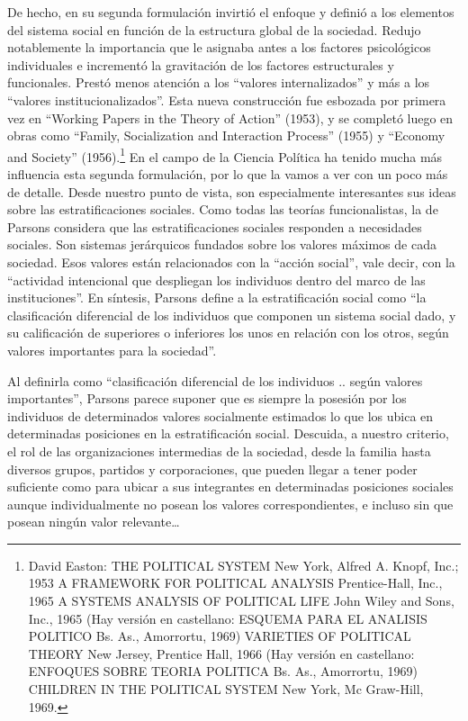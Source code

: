\documentclass[
]{book}
\begin{document}
De hecho, en su segunda formulación invirtió el enfoque y definió a los elementos del sistema social en función de la estructura global de la sociedad. Redujo notablemente la importancia que le asignaba antes a los factores psicológicos individuales e incrementó la gravitación de los factores estructurales y funcionales. Prestó menos atención a los ``valores internalizados'' y más a los ``valores institucionalizados''. Esta nueva construcción fue esbozada por primera vez en ``Working Papers in the Theory of Action'' (1953), y se completó luego en obras como ``Family, Socialization and Interaction Process'' (1955) y ``Economy and Society'' (1956).\footnote{David Easton: THE POLITICAL SYSTEM New York, Alfred A. Knopf, Inc.; 1953 A FRAMEWORK FOR POLITICAL ANALYSIS Prentice-Hall, Inc., 1965 A SYSTEMS ANALYSIS OF POLITICAL LIFE John Wiley and Sons, Inc., 1965 (Hay versión en castellano: ESQUEMA PARA EL ANALISIS POLITICO Bs. As., Amorrortu, 1969) VARIETIES OF POLITICAL THEORY New Jersey, Prentice Hall, 1966 (Hay versión en castellano: ENFOQUES SOBRE TEORIA POLITICA Bs. As., Amorrortu, 1969) CHILDREN IN THE POLITICAL SYSTEM New York, Mc Graw-Hill, 1969.} En el campo de la Ciencia Política ha tenido mucha más influencia esta segunda formulación, por lo que la vamos a ver con un poco más de detalle. Desde nuestro punto de vista, son especialmente interesantes sus ideas sobre las estratificaciones sociales. Como todas las teorías funcionalistas, la de Parsons considera que las estratificaciones sociales responden a necesidades sociales. Son sistemas jerárquicos fundados sobre los valores máximos de cada sociedad. Esos valores están relacionados con la ``acción social'', vale decir, con la ``actividad intencional que despliegan los individuos dentro del marco de las instituciones''. En síntesis, Parsons define a la estratificación social como ``la clasificación diferencial de los individuos que componen un sistema social dado, y su calificación de superiores o inferiores los unos en relación con los otros, según valores importantes para la sociedad''.

Al definirla como ``clasificación diferencial de los individuos .. según valores importantes'', Parsons parece suponer que es siempre la posesión por los individuos de determinados valores socialmente estimados lo que los ubica en determinadas posiciones en la estratificación social. Descuida, a nuestro criterio, el rol de las organizaciones intermedias de la sociedad, desde la familia hasta diversos grupos, partidos y corporaciones, que pueden llegar a tener poder suficiente como para ubicar a sus integrantes en determinadas posiciones sociales aunque individualmente no posean los valores correspondientes, e incluso sin que posean ningún valor relevante\ldots{}
\end{document}
